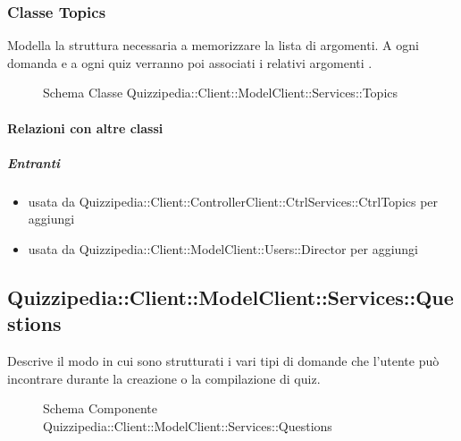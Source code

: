 \subsubsection{Classe Topics}
Modella la struttura necessaria a memorizzare la lista di argomenti. A ogni domanda e a ogni quiz verranno poi associati i relativi argomenti .
\begin{figure}[H]
\centering
\noindent{}
\caption[Schema Classe Topics]{Schema Classe Quizzipedia::Client::ModelClient::Services::Topics}
\end{figure}
\paragraph{Relazioni con altre classi}
\subparagraph{Entranti}
\begin{itemize}
\item usata da Quizzipedia::Client::ControllerClient::CtrlServices::CtrlTopics per aggiungi
\item usata da Quizzipedia::Client::ModelClient::Users::Director per aggiungi
\end{itemize}
\subsection{Quizzipedia::Client::ModelClient::Services::Questions}
Descrive il modo in cui sono strutturati i vari tipi di domande che l'utente può incontrare durante la creazione o la compilazione di quiz.
\begin{figure}[H]
\centering
\noindent{}
\caption[Schema Componente Quizzipedia::Client::ModelClient::Services::Questions]{Schema Componente Quizzipedia::Client::ModelClient::Services::Questions}
\end{figure}
